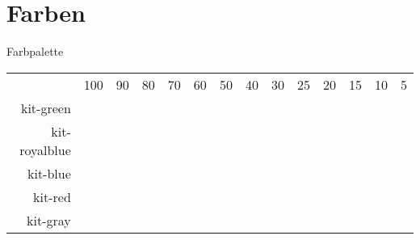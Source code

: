 \documentclass{sdqbeamer}
\begin{document}
\section{Farben}
\begin{frame}{Farbpalette}
\newcommand{\csq}{\strut\hskip1.2em}
\begin{tabular}{rccccccccccccc}
	& 100 & 90 & 80 & 70 & 60 & 50 & 40 & 30 & 25 & 20 & 15 & 10 & 5\\
	kit-green
	& \colorbox{kit-green100}{\csq}
	& \colorbox{kit-green90}{\csq}
	& \colorbox{kit-green80}{\csq}
	& \colorbox{kit-green70}{\csq}
	& \colorbox{kit-green60}{\csq}
	& \colorbox{kit-green50}{\csq}
	& \colorbox{kit-green40}{\csq}
	& \colorbox{kit-green30}{\csq}
	& \colorbox{kit-green25}{\csq}
	& \colorbox{kit-green20}{\csq}
	& \colorbox{kit-green15}{\csq}
	& \colorbox{kit-green10}{\csq}
	& \colorbox{kit-green5}{\csq}\\[.5em]
	kit-royalblue
	& \colorbox{kit-royalblue100}{\csq}
	& \colorbox{kit-royalblue90}{\csq}
	& \colorbox{kit-royalblue80}{\csq}
	& \colorbox{kit-royalblue70}{\csq}
	& \colorbox{kit-royalblue60}{\csq}
	& \colorbox{kit-royalblue50}{\csq}
	& \colorbox{kit-royalblue40}{\csq}
	& \colorbox{kit-royalblue30}{\csq}
	& \colorbox{kit-royalblue25}{\csq}
	& \colorbox{kit-royalblue20}{\csq}
	& \colorbox{kit-royalblue15}{\csq}
	& \colorbox{kit-royalblue10}{\csq}
	& \colorbox{kit-royalblue5}{\csq}\\[.5em]
	kit-blue
	& \colorbox{kit-blue100}{\csq}
	& \colorbox{kit-blue90}{\csq}
	& \colorbox{kit-blue80}{\csq}
	& \colorbox{kit-blue70}{\csq}
	& \colorbox{kit-blue60}{\csq}
	& \colorbox{kit-blue50}{\csq}
	& \colorbox{kit-blue40}{\csq}
	& \colorbox{kit-blue30}{\csq}
	& \colorbox{kit-blue25}{\csq}
	& \colorbox{kit-blue20}{\csq}
	& \colorbox{kit-blue15}{\csq}
	& \colorbox{kit-blue10}{\csq}
	& \colorbox{kit-blue5}{\csq}\\[.5em]
	kit-red
	& \colorbox{kit-red100}{\csq}
	& \colorbox{kit-red90}{\csq}
	& \colorbox{kit-red80}{\csq}
	& \colorbox{kit-red70}{\csq}
	& \colorbox{kit-red60}{\csq}
	& \colorbox{kit-red50}{\csq}
	& \colorbox{kit-red40}{\csq}
	& \colorbox{kit-red30}{\csq}
	& \colorbox{kit-red25}{\csq}
	& \colorbox{kit-red20}{\csq}
	& \colorbox{kit-red15}{\csq}
	& \colorbox{kit-red10}{\csq}
	& \colorbox{kit-red5}{\csq}\\[.5em]
	kit-gray	
	& \colorbox{kit-gray100}{\csq}
	& \colorbox{kit-gray90}{\csq}

\end{tabular}
\end{frame}
\end{document}
